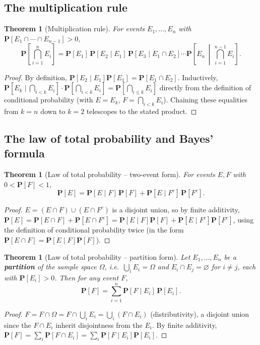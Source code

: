 \documentclass[11pt]{article}
\theoremstyle{definition}
\theoremstyle{plain}
\newtheorem{theorem}[definition]{Theorem}
\theoremstyle{remark}
\begin{document}
\subsection{The multiplication rule}

\begin{theorem}[Multiplication rule]
For events $E_1,\dots,E_n$ with $\mathbf{P}[E_1\cap\cdots\cap E_{n-1}]>0$,
\[
\mathbf{P}\!\left[\bigcap_{i=1}^n E_i\right] = \mathbf{P}[E_1]\,\mathbf{P}[E_2\mid E_1]\,
\mathbf{P}[E_3\mid E_1\cap E_2]\cdots \mathbf{P}\!\left[E_n \,\middle|\, \bigcap_{i=1}^{n-1}E_i\right].
\]
\end{theorem}
\begin{proof}
By definition, $\mathbf{P}[E_2\mid E_1]\mathbf{P}[E_1] = \mathbf{P}[E_1\cap E_2]$. Inductively,
$\mathbf{P}\!\left[E_k \mid \bigcap_{i<k}E_i\right]\cdot \mathbf{P}\!\left[\bigcap_{i<k}E_i\right]
= \mathbf{P}\!\left[\bigcap_{i\le k}E_i\right]$ directly from the definition of conditional
probability (with $E=E_k$, $F=\bigcap_{i<k}E_i$). Chaining these equalities from $k=n$ down to
$k=2$ telescopes to the stated product.
\end{proof}

\subsection{The law of total probability and Bayes' formula}

\begin{theorem}[Law of total probability -- two-event form]
For events $E,F$ with $0<\mathbf{P}[F]<1$,
\[
\mathbf{P}[E] = \mathbf{P}[E\mid F]\,\mathbf{P}[F] + \mathbf{P}[E\mid F^c]\,\mathbf{P}[F^c].
\]
\end{theorem}
\begin{proof}
$E = (E\cap F)\cup(E\cap F^c)$ is a disjoint union, so by finite additivity,
$\mathbf{P}[E]=\mathbf{P}[E\cap F]+\mathbf{P}[E\cap F^c]
= \mathbf{P}[E\mid F]\mathbf{P}[F] + \mathbf{P}[E\mid F^c]\mathbf{P}[F^c]$, using the definition of
conditional probability twice (in the form $\mathbf{P}[E\cap F]=\mathbf{P}[E\mid F]\mathbf{P}[F]$).
\end{proof}

\begin{theorem}[Law of total probability -- partition form]
Let $E_1,\dots,E_n$ be a \textbf{partition} of the sample space $\Omega$, i.e.\
$\bigcup_i E_i = \Omega$ and $E_i \cap E_j = \varnothing$ for $i \ne j$, each with
$\mathbf{P}[E_i]>0$. Then for any event $F$,
\[
\mathbf{P}[F] = \sum_{i=1}^n \mathbf{P}[F\mid E_i]\,\mathbf{P}[E_i].
\]
\end{theorem}
\begin{proof}
$F = F \cap \Omega = F \cap \bigcup_i E_i = \bigcup_i (F\cap E_i)$ (distributivity), a disjoint
union since the $F\cap E_i$ inherit disjointness from the $E_i$. By finite additivity,
$\mathbf{P}[F] = \sum_i \mathbf{P}[F\cap E_i] = \sum_i \mathbf{P}[F\mid E_i]\mathbf{P}[E_i]$.
\end{proof}
\end{document}
